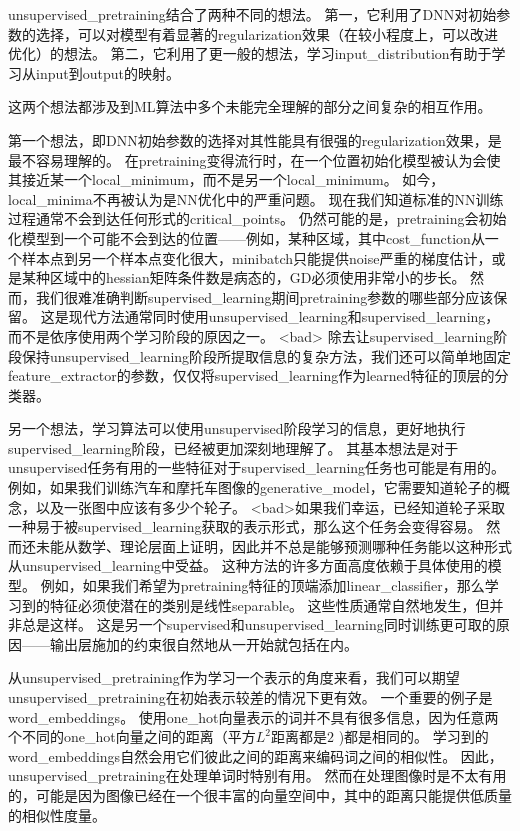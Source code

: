 \gls{unsupervised_pretraining}结合了两种不同的想法。
第一，它利用了\gls{DNN}对初始参数的选择，可以对模型有着显著的\gls{regularization}效果（在较小程度上，可以改进优化）的想法。
第二，它利用了更一般的想法，学习\gls{input_distribution}有助于学习从\gls{input}到\gls{output}的映射。


这两个想法都涉及到\gls{ML}算法中多个未能完全理解的部分之间复杂的相互作用。

第一个想法，即\gls{DNN}初始参数的选择对其性能具有很强的\gls{regularization}效果，是最不容易理解的。
在\gls{pretraining}变得流行时，在一个位置初始化模型被认为会使其接近某一个\gls{local_minimum}，而不是另一个\gls{local_minimum}。%
如今，\gls{local_minima}不再被认为是\gls{NN}优化中的严重问题。
现在我们知道标准的\gls{NN}训练过程通常不会到达任何形式的\gls{critical_points}。
仍然可能的是，\gls{pretraining}会初始化模型到一个可能不会到达的位置——例如，某种区域，其中\gls{cost_function}从一个样本点到另一个样本点变化很大，\gls{minibatch}只能提供\gls{noise}严重的梯度估计，或是某种区域中的\gls{hessian}矩阵条件数是病态的，\gls{GD}必须使用非常小的步长。
然而，我们很难准确判断\gls{supervised_learning}期间\gls{pretraining}参数的哪些部分应该保留。
这是现代方法通常同时使用\gls{unsupervised_learning}和\gls{supervised_learning}，而不是依序使用两个学习阶段的原因之一。
<bad> 除去让\gls{supervised_learning}阶段保持\gls{unsupervised_learning}阶段所提取信息的复杂方法，我们还可以简单地固定\gls{feature_extractor}的参数，仅仅将\gls{supervised_learning}作为\gls{learned}特征的顶层的分类器。%


另一个想法，学习算法可以使用\gls{unsupervised}阶段学习的信息，更好地执行\gls{supervised_learning}阶段，已经被更加深刻地理解了。
其基本想法是对于\gls{unsupervised}任务有用的一些特征对于\gls{supervised_learning}任务也可能是有用的。
例如，如果我们训练汽车和摩托车图像的\gls{generative_model}，它需要知道轮子的概念，以及一张图中应该有多少个轮子。
<bad>如果我们幸运，已经知道轮子采取一种易于被\gls{supervised_learning}获取的表示形式，那么这个任务会变得容易。%
然而还未能从数学、理论层面上证明，因此并不总是能够预测哪种任务能以这种形式从\gls{unsupervised_learning}中受益。
这种方法的许多方面高度依赖于具体使用的模型。
例如，如果我们希望为\gls{pretraining}特征的顶端添加\gls{linear_classifier}，那么学习到的特征必须使潜在的类别是线性\gls{separable}。
这些性质通常自然地发生，但并非总是这样。
这是另一个\gls{supervised}和\gls{unsupervised_learning}同时训练更可取的原因——输出层施加的约束很自然地从一开始就包括在内。


从\gls{unsupervised_pretraining}作为学习一个表示的角度来看，我们可以期望\gls{unsupervised_pretraining}在初始表示较差的情况下更有效。
一个重要的例子是\gls{word_embeddings}。
使用\gls{one_hot}向量表示的词并不具有很多信息，因为任意两个不同的\gls{one_hot}向量之间的距离（平方$L^2$距离都是$2$ )都是相同的。
学习到的\gls{word_embeddings}自然会用它们彼此之间的距离来编码词之间的相似性。
因此，\gls{unsupervised_pretraining}在处理单词时特别有用。
然而在处理图像时是不太有用的，可能是因为图像已经在一个很丰富的向量空间中，其中的距离只能提供低质量的相似性度量。


